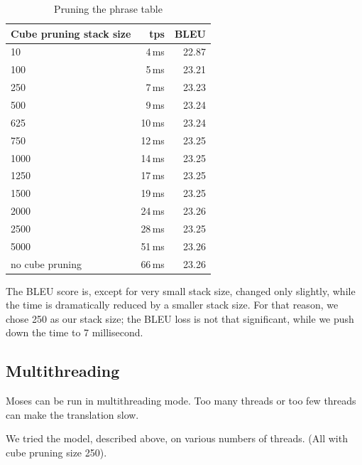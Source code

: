 \begin{table}[h]
\begin{center}
\begin{tabular}{|l|r|r|}
    \hline
    \textbf{Cube pruning stack size} &  \textbf{tps} & \textbf{BLEU} \\ \hline
    10 & 4\,ms & 22.87 \\ \hline
    100 & 5\,ms & 23.21 \\ \hline
    250 & 7\,ms & 23.23 \\ \hline
    500 & 9\,ms & 23.24 \\ \hline
    625 & 10\,ms&23.24 \\ \hline
    750 & 12\,ms&23.25\\ \hline
    1000 & 14\,ms & 23.25 \\ \hline
    1250 & 17\,ms & 23.25 \\ \hline
    1500 & 19\,ms & 23.25 \\ \hline
    2000 & 24\,ms & 23.26 \\ \hline
    2500 & 28\,ms & 23.25 \\ \hline
    5000 & 51\,ms & 23.26 \\ \hline
    no cube pruning & 66\,ms & 23.26 \\ \hline
\end{tabular}
\end{center}

\caption{Pruning the phrase table}\label{moses:cubepruning}
\end{table}

The BLEU score is, except for very small stack size, changed only slightly, while the time is dramatically reduced by a smaller stack size. For that reason, we chose 250 as our stack size; the BLEU loss is not that significant, while we push down the time to 7 millisecond.

\subsection{Multithreading}
Moses can be run in multithreading mode. Too many threads or too few threads can make the translation slow.

We tried the model, described above, on various numbers of threads. (All with cube pruning size 250).

